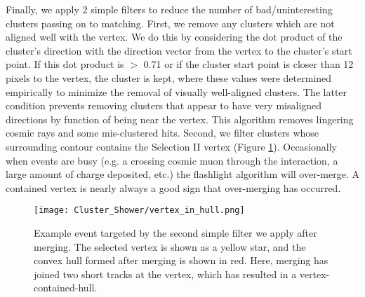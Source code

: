 \par Finally, we apply 2 simple filters to reduce the number of bad/uninteresting clusters passing on to matching. First, we remove any clusters which are not aligned well with the vertex.  We do this by considering the dot product of the cluster's direction with the direction vector from the vertex to the cluster's start point.  If this dot product is $>$ 0.71 or if the cluster start point is closer than 12 pixels to the vertex, the cluster is kept, where these values were determined empirically to minimize the removal of visually well-aligned clusters.  The latter condition prevents removing clusters that appear to have very misaligned directions by function of being near the vertex. This algorithm removes lingering cosmic rays and some mis-clustered hits. Second, we filter clusters whose surrounding contour contains the Selection II vertex (Figure \ref{fig:vertex_in_hull}). Occasionally when events are busy (e.g. a crossing cosmic muon through the interaction, a large amount of charge deposited, etc.) the flashlight algorithm will over-merge. A contained vertex is nearly always a good sign that over-merging has occurred.  

\begin{figure}[H]
\centering
\texttt{[image: Cluster\_Shower/vertex\_in\_hull.png]}
\caption{Example event targeted by the second simple filter we apply after merging. The selected vertex is shown as a yellow star, and the convex hull formed after merging is shown in red. Here, merging has joined two short tracks at the vertex, which has resulted in a vertex-contained-hull. }
\label{fig:vertex_in_hull}
\end{figure}


